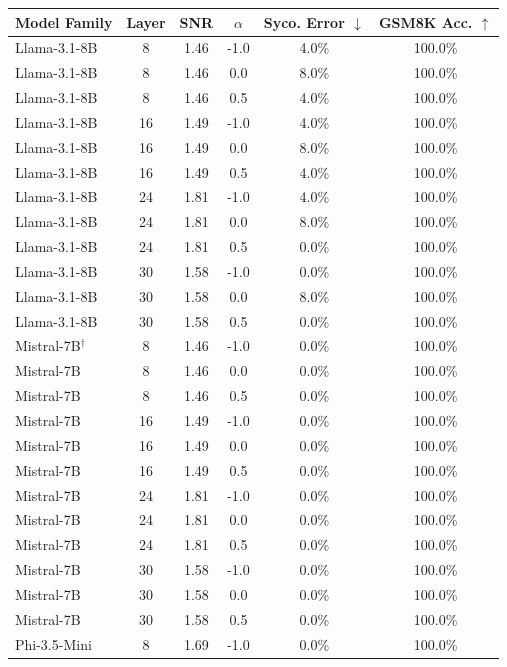 \documentclass{article}
\begin{document}
\begin{center}
\begin{tabular}{lccccc}
\toprule
\textbf{Model Family} & \textbf{Layer} & \textbf{SNR} & \textbf{$\alpha$} & \textbf{Syco. Error $\downarrow$} & \textbf{GSM8K Acc. $\uparrow$} \\
\midrule
Llama-3.1-8B & 8 & 1.46 & -1.0 & 4.0\% & 100.0\% \\
Llama-3.1-8B & 8 & 1.46 & 0.0 & 8.0\% & 100.0\% \\
Llama-3.1-8B & 8 & 1.46 & 0.5 & 4.0\% & 100.0\% \\
Llama-3.1-8B & 16 & 1.49 & -1.0 & 4.0\% & 100.0\% \\
Llama-3.1-8B & 16 & 1.49 & 0.0 & 8.0\% & 100.0\% \\
Llama-3.1-8B & 16 & 1.49 & 0.5 & 4.0\% & 100.0\% \\
Llama-3.1-8B & 24 & 1.81 & -1.0 & 4.0\% & 100.0\% \\
Llama-3.1-8B & 24 & 1.81 & 0.0 & 8.0\% & 100.0\% \\
Llama-3.1-8B & 24 & 1.81 & 0.5 & 0.0\% & 100.0\% \\
Llama-3.1-8B & 30 & 1.58 & -1.0 & 0.0\% & 100.0\% \\
Llama-3.1-8B & 30 & 1.58 & 0.0 & 8.0\% & 100.0\% \\
Llama-3.1-8B & 30 & 1.58 & 0.5 & 0.0\% & 100.0\% \\
Mistral-7B$^\dagger$ & 8 & 1.46 & -1.0 & 0.0\% & 100.0\% \\
Mistral-7B & 8 & 1.46 & 0.0 & 0.0\% & 100.0\% \\
Mistral-7B & 8 & 1.46 & 0.5 & 0.0\% & 100.0\% \\
Mistral-7B & 16 & 1.49 & -1.0 & 0.0\% & 100.0\% \\
Mistral-7B & 16 & 1.49 & 0.0 & 0.0\% & 100.0\% \\
Mistral-7B & 16 & 1.49 & 0.5 & 0.0\% & 100.0\% \\
Mistral-7B & 24 & 1.81 & -1.0 & 0.0\% & 100.0\% \\
Mistral-7B & 24 & 1.81 & 0.0 & 0.0\% & 100.0\% \\
Mistral-7B & 24 & 1.81 & 0.5 & 0.0\% & 100.0\% \\
Mistral-7B & 30 & 1.58 & -1.0 & 0.0\% & 100.0\% \\
Mistral-7B & 30 & 1.58 & 0.0 & 0.0\% & 100.0\% \\
Mistral-7B & 30 & 1.58 & 0.5 & 0.0\% & 100.0\% \\
Phi-3.5-Mini & 8 & 1.69 & -1.0 & 0.0\% & 100.0\% \\

\end{tabular}
\end{center}
\end{document}
